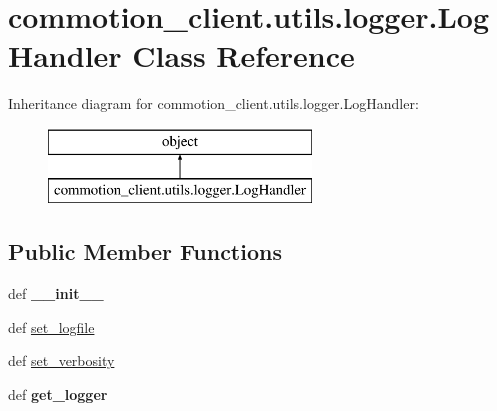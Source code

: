 \hypertarget{classcommotion__client_1_1utils_1_1logger_1_1LogHandler}{\section{commotion\+\_\+client.\+utils.\+logger.\+Log\+Handler Class Reference}
\label{classcommotion__client_1_1utils_1_1logger_1_1LogHandler}
}
Inheritance diagram for commotion\+\_\+client.\+utils.\+logger.\+Log\+Handler\+:\begin{figure}[H]
\begin{center}
\leavevmode
\includegraphics[height=2.000000cm]{classcommotion__client_1_1utils_1_1logger_1_1LogHandler}
\end{center}
\end{figure}
\subsection*{Public Member Functions}
\begin{DoxyCompactItemize}
\item 
\hypertarget{classcommotion__client_1_1utils_1_1logger_1_1LogHandler_a505b62933baef8f074b615aad533d059}{def {\bfseries \+\_\+\+\_\+init\+\_\+\+\_\+}}\label{classcommotion__client_1_1utils_1_1logger_1_1LogHandler_a505b62933baef8f074b615aad533d059}

\item 
def \hyperlink{classcommotion__client_1_1utils_1_1logger_1_1LogHandler_a1d1431f7384b19dc25e176361b7eeb23}{set\+\_\+logfile}
\item 
def \hyperlink{classcommotion__client_1_1utils_1_1logger_1_1LogHandler_a3d76d342b09b2d51753751e5f64f48df}{set\+\_\+verbosity}
\item 
\hypertarget{classcommotion__client_1_1utils_1_1logger_1_1LogHandler_ac9b855879e61081132fae4067b330507}{def {\bfseries get\+\_\+logger}}\label{classcommotion__client_1_1utils_1_1logger_1_1LogHandler_ac9b855879e61081132fae4067b330507}

\end{DoxyCompactItemize}

